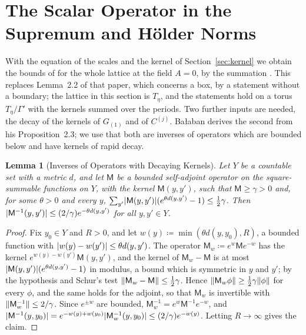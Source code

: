 \documentclass[11pt]{preprint}
\DeclarePairedDelimiter{\abs}{\lvert}{\rvert}
\DeclarePairedDelimiter{\norm}{\lVert}{\rVert}
\numberwithin{equation}{section}
\newtheorem{lemma}[theorem]{Lemma}
\theoremstyle{definition}
\theoremstyle{remark}
\theoremstyle{plain}
\begin{document}
\section{The Scalar Operator in the Supremum and H\"older Norms}\label{sec:sup-bounds}

With the equation of the scales and the kernel of Section~\ref{sec:kernel} we obtain the bounds of \cite[(1.9), (1.10)]{BalabanRDG} for the whole lattice at the field $A = 0$, by the summation \cite[(2.38), (2.39)]{BalabanRDG}. This replaces Lemma~2.2 of that paper, which concerns a box, by a statement without a boundary; the lattice in this section is $T_\eta$, and the statements hold on a torus $T_\eta/\Gamma'$ with the kernels summed over the periods. Two further inputs are needed, the decay of the kernels of $G_{(1)}$ and of $C^{(j)}$. Ba{\l}aban derives the second from his Proposition~2.3; we use that both are inverses of operators which are bounded below and have kernels of rapid decay.

\begin{lemma}[Inverses of Operators with Decaying Kernels]\label{lem:combes-thomas}
Let $Y$ be a countable set with a metric $d$, and let $\mathsf M$ be a bounded self-adjoint operator on the square-summable functions on $Y$, with the kernel $\mathsf M(y, y')$, such that $\mathsf M \geq \gamma > 0$ and, for some $\theta > 0$ and every $y$, $\sum_{y'}\abs{\mathsf M(y, y')}(e^{\theta d(y, y')} - 1) \leq \frac12\gamma$. Then $\abs{\mathsf M^{-1}(y, y')} \leq (2/\gamma)e^{-\theta d(y, y')}$ for all $y, y' \in Y$.
\end{lemma}

\begin{proof}
Fix $y_0 \in Y$ and $R > 0$, and let $w(y) \coloneqq \min(\theta d(y, y_0), R)$, a bounded function with $\abs{w(y) - w(y')} \leq \theta d(y, y')$. The operator $\mathsf M_w \coloneqq e^w\mathsf Me^{-w}$ has the kernel $e^{w(y) - w(y')}\mathsf M(y, y')$, and the kernel of $\mathsf M_w - \mathsf M$ is at most $\abs{\mathsf M(y, y')}(e^{\theta d(y, y')} - 1)$ in modulus, a bound which is symmetric in $y$ and $y'$; by the hypothesis and Schur's test $\norm{\mathsf M_w - \mathsf M} \leq \frac12\gamma$. Hence $\norm{\mathsf M_w\phi} \geq \frac12\gamma\norm\phi$ for every $\phi$, and the same holds for the adjoint, so that $\mathsf M_w$ is invertible with $\norm{\mathsf M_w^{-1}} \leq 2/\gamma$. Since $e^{\pm w}$ are bounded, $\mathsf M_w^{-1} = e^w\mathsf M^{-1}e^{-w}$, and $\abs{\mathsf M^{-1}(y, y_0)} = e^{-w(y) + w(y_0)}\abs{\mathsf M_w^{-1}(y, y_0)} \leq (2/\gamma)e^{-w(y)}$. Letting $R \to \infty$ gives the claim.
\end{proof}
\end{document}
